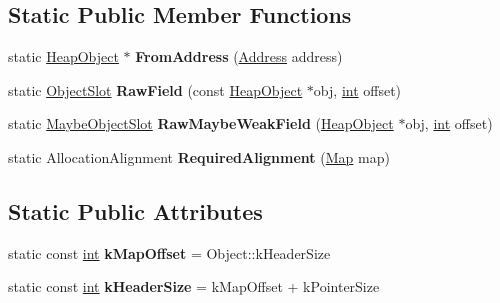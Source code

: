 \subsection*{Static Public Member Functions}
\begin{DoxyCompactItemize}
\item 
\mbox{\label{classv8_1_1internal_1_1HeapObject_ad0f8ad242fc277a0ad804d539e1c1f7f}} 
static \mbox{\hyperlink{classv8_1_1internal_1_1HeapObject}{Heap\+Object}} $\ast$ {\bfseries From\+Address} (\mbox{\hyperlink{classuintptr__t}{Address}} address)
\item 
\mbox{\label{classv8_1_1internal_1_1HeapObject_a9335d839a37b86de90ae00f8d8fa0cba}} 
static \mbox{\hyperlink{classv8_1_1internal_1_1ObjectSlot}{Object\+Slot}} {\bfseries Raw\+Field} (const \mbox{\hyperlink{classv8_1_1internal_1_1HeapObject}{Heap\+Object}} $\ast$obj, \mbox{\hyperlink{classint}{int}} offset)
\item 
\mbox{\label{classv8_1_1internal_1_1HeapObject_a106416f8d3087dd4c44f0e13f64a7000}} 
static \mbox{\hyperlink{classv8_1_1internal_1_1MaybeObjectSlot}{Maybe\+Object\+Slot}} {\bfseries Raw\+Maybe\+Weak\+Field} (\mbox{\hyperlink{classv8_1_1internal_1_1HeapObject}{Heap\+Object}} $\ast$obj, \mbox{\hyperlink{classint}{int}} offset)
\item 
\mbox{\label{classv8_1_1internal_1_1HeapObject_a0eb92a5d0b84f90fa5c5aa89fa2fab55}} 
static Allocation\+Alignment {\bfseries Required\+Alignment} (\mbox{\hyperlink{classv8_1_1internal_1_1Map}{Map}} map)
\end{DoxyCompactItemize}
\subsection*{Static Public Attributes}
\begin{DoxyCompactItemize}
\item 
\mbox{\label{classv8_1_1internal_1_1HeapObject_a0c150f83dc5605634f591e84c8a8ce2a}} 
static const \mbox{\hyperlink{classint}{int}} {\bfseries k\+Map\+Offset} = Object\+::k\+Header\+Size
\item 
\mbox{\label{classv8_1_1internal_1_1HeapObject_ac3b060e34e0c5523cd8ad9d734a0a498}} 
static const \mbox{\hyperlink{classint}{int}} {\bfseries k\+Header\+Size} = k\+Map\+Offset + k\+Pointer\+Size
\end{DoxyCompactItemize}
